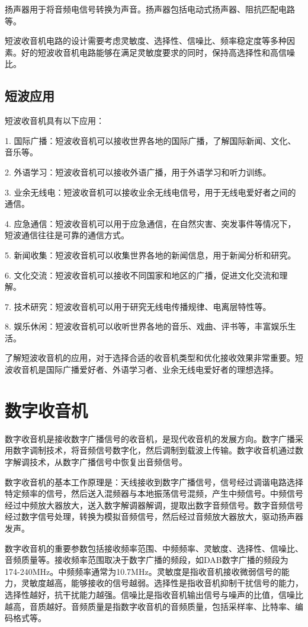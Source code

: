 \documentclass[12pt,UTF8]{ctexbook}
\begin{document}
扬声器用于将音频电信号转换为声音。扬声器包括电动式扬声器、阻抗匹配电路等。

短波收音机电路的设计需要考虑灵敏度、选择性、信噪比、频率稳定度等多种因素。好的短波收音机电路能够在满足灵敏度要求的同时，保持高选择性和高信噪比。

\subsection{短波应用}

短波收音机具有以下应用：

1. 国际广播：短波收音机可以接收世界各地的国际广播，了解国际新闻、文化、音乐等。

2. 外语学习：短波收音机可以接收外语广播，用于外语学习和听力训练。

3. 业余无线电：短波收音机可以接收业余无线电信号，用于无线电爱好者之间的通信。

4. 应急通信：短波收音机可以用于应急通信，在自然灾害、突发事件等情况下，短波通信往往是可靠的通信方式。

5. 新闻收集：短波收音机可以收集世界各地的新闻信息，用于新闻分析和研究。

6. 文化交流：短波收音机可以接收不同国家和地区的广播，促进文化交流和理解。

7. 技术研究：短波收音机可以用于研究无线电传播规律、电离层特性等。

8. 娱乐休闲：短波收音机可以收听世界各地的音乐、戏曲、评书等，丰富娱乐生活。

了解短波收音机的应用，对于选择合适的收音机类型和优化接收效果非常重要。短波收音机是国际广播爱好者、外语学习者、业余无线电爱好者的理想选择。

\section{数字收音机}

数字收音机是接收数字广播信号的收音机，是现代收音机的发展方向。数字广播采用数字调制技术，将音频信号数字化，然后调制到载波上传输。数字收音机通过数字解调技术，从数字广播信号中恢复出音频信号。

数字收音机的基本工作原理是：天线接收到数字广播信号，信号经过调谐电路选择特定频率的信号，然后送入混频器与本地振荡信号混频，产生中频信号。中频信号经过中频放大器放大，送入数字解调器解调，提取出数字音频信号。数字音频信号经过数字信号处理，转换为模拟音频信号，然后经过音频放大器放大，驱动扬声器发声。

数字收音机的重要参数包括接收频率范围、中频频率、灵敏度、选择性、信噪比、音频质量等。接收频率范围取决于数字广播的频段，如DAB数字广播的频段为174-240MHz。中频频率通常为10.7MHz。灵敏度是指收音机接收微弱信号的能力，灵敏度越高，能够接收的信号越弱。选择性是指收音机抑制干扰信号的能力，选择性越好，抗干扰能力越强。信噪比是指收音机输出信号与噪声的比值，信噪比越高，音质越好。音频质量是指数字收音机的音频质量，包括采样率、比特率、编码格式等。
\end{document}
